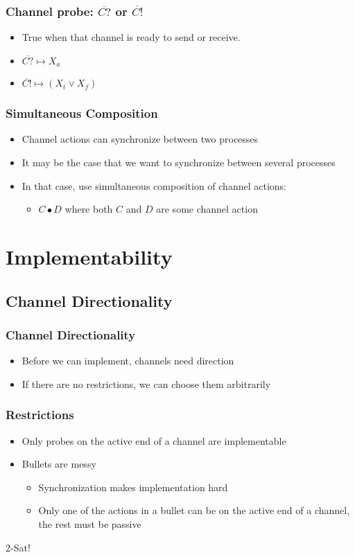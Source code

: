 \documentclass[compress]{beamer}
\begin{document}
\begin{frame}
\frametitle{Channel probe: $\overline{C?}$ or $\overline{C!}$}
\begin{itemize}
\item True when that channel is ready to send or receive.
\item $\overline{C?} \mapsto X_a$
\item $\overline{C!} \mapsto (X_t \lor X_f)$
\end{itemize}
\end{frame}
\begin{frame}
\frametitle{Simultaneous Composition}
\begin{itemize}
\item Channel actions can synchronize between two processes
\item It may be the case that we want to synchronize between several processes
\item In that case, use simultaneous composition of channel actions:
\begin{itemize}
\item $C \bullet D$ where both $C$ and $D$ are some channel action
\end{itemize}
\end{itemize}
\end{frame}
\section{Implementability}
\subsection{Channel Directionality}
\begin{frame}
\frametitle{Channel Directionality}
\pause
\begin{itemize}
    \item Before we can implement, channels need direction
    \pause
    \item If there are no restrictions, we can choose them arbitrarily
\end{itemize}
\end{frame}
\begin{frame}
\frametitle{Restrictions}
\pause
\begin{itemize}
    \item Only probes on the active end of a channel are implementable
    \pause
    \item Bullets are messy
    \pause
    \begin{itemize}
        \item Synchronization makes implementation hard
        \pause
        \item Only one of the actions in a bullet can be on the active end of a channel, the rest must be passive
    \end{itemize}
\end{itemize}
\end{frame}
\begin{frame}[plain]
\begin{center}
\huge 2-Sat!
\end{center}
\end{frame}
\end{document}
